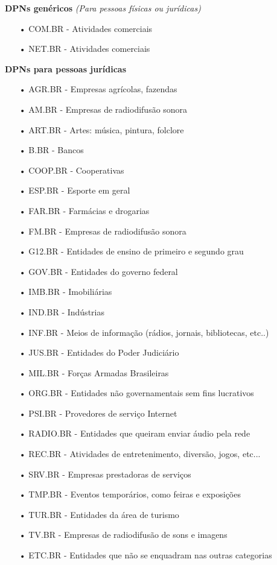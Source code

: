 \documentclass[12pt, a4paper]{abnt}
\begin{document}
\textbf{DPNs genéricos} \textit{(Para pessoas físicas ou jurídicas)}
\begin{enumerate}
\item[•] COM.BR - Atividades comerciais
\item[•] NET.BR - Atividades comerciais
\end{enumerate}

\textbf{DPNs para pessoas jurídicas}
\begin{enumerate}
\item[•] AGR.BR - Empresas agrícolas, fazendas
\item[•] AM.BR - Empresas de radiodifusão sonora
\item[•] ART.BR - Artes: música, pintura, folclore
\item[•] B.BR - Bancos
\item[•] COOP.BR - Cooperativas
\item[•] ESP.BR - Esporte em geral
\item[•] FAR.BR - Farmácias e drogarias
\item[•] FM.BR - Empresas de radiodifusão sonora
\item[•] G12.BR - Entidades de ensino de primeiro e segundo grau
\item[•] GOV.BR - Entidades do governo federal
\item[•] IMB.BR - Imobiliárias
\item[•] IND.BR - Indústrias
\item[•] INF.BR - Meios de informação (rádios, jornais, bibliotecas, etc..)
\item[•] JUS.BR - Entidades do Poder Judiciário
\item[•] MIL.BR - Forças Armadas Brasileiras
\item[•] ORG.BR - Entidades não governamentais sem fins lucrativos
\item[•] PSI.BR - Provedores de serviço Internet
\item[•] RADIO.BR - Entidades que queiram enviar áudio pela rede
\item[•] REC.BR - Atividades de entretenimento, diversão, jogos, etc...
\item[•] SRV.BR - Empresas prestadoras de serviços
\item[•] TMP.BR - Eventos temporários, como feiras e exposições
\item[•] TUR.BR - Entidades da área de turismo
\item[•] TV.BR - Empresas de radiodifusão de sons e imagens
\item[•] ETC.BR - Entidades que não se enquadram nas outras categorias
\end{enumerate}
\end{document}

